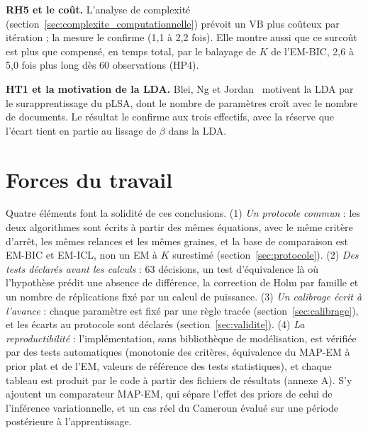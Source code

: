 \textbf{RH5 et le coût.} L'analyse de complexité (section~\ref{sec:complexite_computationnelle}) prévoit un VB plus coûteux par itération ; la mesure le confirme (1,1 à 2,2 fois). Elle montre aussi que ce surcoût est plus que compensé, en temps total, par le balayage de $K$ de l'EM-BIC, 2,6 à 5,0 fois plus long dès 60 observations (HP4).

\textbf{HT1 et la motivation de la LDA.} Blei, Ng et Jordan~\cite{blei2003} motivent la LDA par le surapprentissage du pLSA, dont le nombre de paramètres croît avec le nombre de documents. Le résultat le confirme aux trois effectifs, avec la réserve que l'écart tient en partie au lissage de $\beta$ dans la LDA.

\section{Forces du travail}\label{sec:forces}
Quatre éléments font la solidité de ces conclusions. (1) \emph{Un protocole commun} : les deux algorithmes sont écrits à partir des mêmes équations, avec le même critère d'arrêt, les mêmes relances et les mêmes graines, et la base de comparaison est EM-BIC et EM-ICL, non un EM à $K$ surestimé (section~\ref{sec:protocole}). (2) \emph{Des tests déclarés avant les calculs} : 63 décisions, un test d'équivalence là où l'hypothèse prédit une absence de différence, la correction de Holm par famille et un nombre de réplications fixé par un calcul de puissance. (3) \emph{Un calibrage écrit à l'avance} : chaque paramètre est fixé par une règle tracée (section~\ref{sec:calibrage}), et les écarts au protocole sont déclarés (section~\ref{sec:validite}). (4) \emph{La reproductibilité} : l'implémentation, sans bibliothèque de modélisation, est vérifiée par des tests automatiques (monotonie des critères, équivalence du MAP-EM à prior plat et de l'EM, valeurs de référence des tests statistiques), et chaque tableau est produit par le code à partir des fichiers de résultats (annexe A). S'y ajoutent un comparateur MAP-EM, qui sépare l'effet des priors de celui de l'inférence variationnelle, et un cas réel du Cameroun évalué sur une période postérieure à l'apprentissage.

